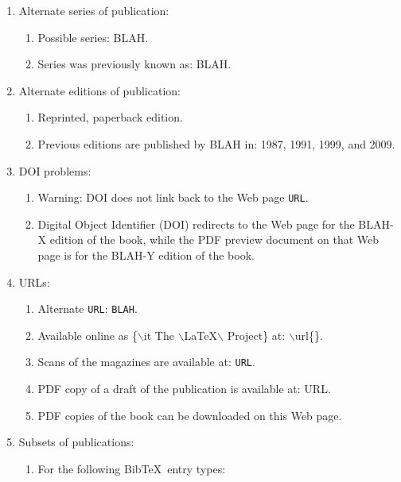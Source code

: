 \documentclass[letter,12pt]{article}
\begin{document}
\begin{enumerate}
\begin{enumerate}
	\item Alternate series of publication: \vspace{-0.2cm}
		\begin{enumerate} \itemsep -2pt
		\item Possible series: BLAH.
		\item Series was previously known as: BLAH.
		\end{enumerate}
	\item Alternate editions of publication: \vspace{-0.2cm}
		\begin{enumerate} \itemsep -2pt
		\item Reprinted, paperback edition.
		\item Previous editions are published by BLAH in: 1987, 1991, 1999, and 2009.
		\end{enumerate}
	\item DOI problems: \vspace{-0.2cm}
		\begin{enumerate} \itemsep -2pt
		\item Warning: DOI does not link back to the Web page {\tt URL}.
		\item Digital Object Identifier (DOI) redirects to the Web page for the BLAH-X edition of the book, while the PDF preview document on that Web page is for the BLAH-Y edition of the book.
		\end{enumerate}
	\item URLs: \vspace{-0.2cm}
		\begin{enumerate} \itemsep -2pt
		\item Alternate {\tt URL}: {\tt BLAH}.
		\item Available online as \{$\backslash$it The $\backslash$LaTeX$\backslash$ Project\} at: $\backslash$url\{\}.
		\item Scans of the magazines are available at: {\tt URL}.
		\item PDF copy of a draft of the publication is available at: URL.
		\item PDF copies of the book can be downloaded on this Web page.
		\end{enumerate}
	\item Subsets of publications: \vspace{-0.2cm}
		\begin{enumerate} \itemsep -2pt
		\item For the following {\sc Bib}\TeX\ entry types: \vspace{-0.1cm}

\end{enumerate}
\end{enumerate}
\end{enumerate}
\end{document}
